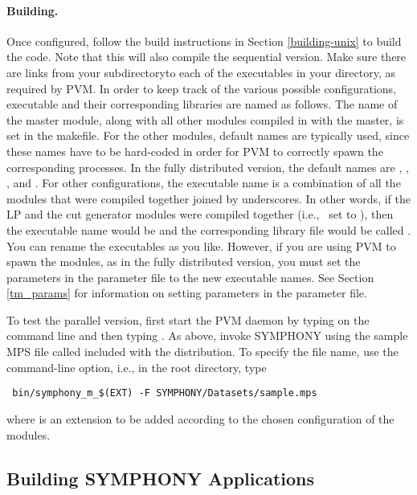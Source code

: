 \paragraph{Building.}

Once configured, follow the build instructions in Section \ref{building-unix}
to build the code. Note that this will also compile the sequential version.
Make sure there are links from your
 subdirectoryto each of the executables in
your  directory, as required by PVM. In order to keep track of
the various possible configurations, executable and their corresponding
libraries are named as follows. The name of the master module, along with all
other modules compiled in with the master, is set in the makefile. For the
other modules, default names are typically used, since these names have to be
hard-coded in order for PVM to correctly spawn the corresponding processes. In
the fully distributed version, the default names are , ,
, and . For other configurations, the executable name is
a combination of all the modules that were compiled together joined by
underscores. In other words, if the LP and the cut generator modules were
compiled together (i.e.,~ set to ), then the executable
name would be  and the corresponding library file would be
called . You can rename the executables as you like.
However, if you are using PVM to spawn the modules, as in the fully
distributed version, you must set the parameters  in the parameter
file to the new executable names. See Section
\ref{tm_params} for information on setting parameters in the parameter file.

To test the parallel version, first start the PVM daemon by typing
 on the command line and then typing . As above,
invoke SYMPHONY using the sample MPS file called  included
with the distribution. To specify the file name, use the 
command-line option, i.e., in the root directory, type
{\color{Brown}
\begin{verbatim}
 bin/symphony_m_$(EXT) -F SYMPHONY/Datasets/sample.mps 
\end{verbatim}
} where  is an extension to be added according to the chosen
configuration of the modules. 

\subsection{Building SYMPHONY Applications}
\label{build_appl_unix}

